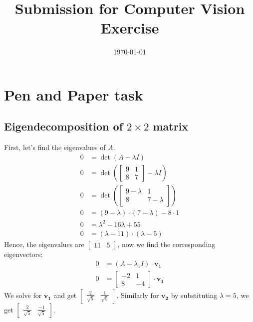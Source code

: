 \documentclass[addpoints]{exam}
\title{Submission for Computer Vision Exercise \assignmentnumber}
\author{\student}
\date{\today}
\begin{document}
    \maketitle


\section{Pen and Paper task}
\subsection{Eigendecomposition of $2 \times 2$ matrix}
First, let's find the eigenvalues of $A$.
\begin{align*}
	0 &= \det\left(A - \lambda I\right)\\
	0 &= \det\left( \begin{bmatrix} 9 & 1 \\ 8 & 7 \end{bmatrix} - \lambda I \right)\\
	0 &= \det\left( \begin{bmatrix} 9 - \lambda & 1 \\ 8 & 7 - \lambda \end{bmatrix}\right)\\
	0 &= \left( 9 - \lambda \right) \cdot \left( 7 - \lambda \right) - 8 \cdot 1\\
	0 &= \lambda^2 - 16\lambda + 55\\
	0 &= \left( \lambda - 11 \right) \cdot \left( \lambda - 5 \right)
\end{align*}
Hence, the eigenvalues are $\begin{bmatrix} 11 & 5 \end{bmatrix}$, now we find the corresponding eigenvectors:
\begin{align*}
	0 &= \left( A - \lambda_1 I \right) \cdot \mathbf{v_1}\\
	0 &= \begin{bmatrix} -2 & 1 \\ 8 & -4 \end{bmatrix} \cdot \mathbf{v_1}
\end{align*}
We solve for $\mathbf{v_1}$ and get $\begin{bmatrix} \frac{2}{\sqrt{5}} & \frac{1}{\sqrt{5}} \end{bmatrix}$. Similarly for $\mathbf{v_2}$ by substituting $\lambda = 5$, we get $\begin{bmatrix} \frac{2}{\sqrt{5}} & \frac{-1}{\sqrt{5}} \end{bmatrix}$.
\end{document}
